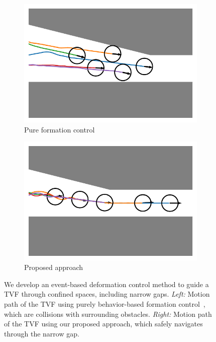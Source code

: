 \begin{figure}
\centering
\begin{subfigure}[b]{0.4\textwidth}
    
    \centering
    \includegraphics[width=\linewidth]{paper2/images/sample_bc.pdf}
    \caption{Pure formation control}
    \label{fig:1sample_bc}
\end{subfigure}
\begin{subfigure}[b]{0.4\textwidth}
    \centering
    \includegraphics[width=\linewidth]{paper2/images/sample_edc.pdf}
    \caption{Proposed approach}
    \label{fig:1sample_edc}
\end{subfigure}
\caption{We develop an event-based deformation control method to guide a TVF through confined spaces, including narrow gaps. \textit{Left:} Motion path of the TVF using purely behavior-based formation control~\cite{736776, Vsrhelyi2018}, which are collisions with surrounding obstacles. \textit{Right:} Motion path of the TVF using our proposed approach, which safely navigates through the narrow gap.}
\label{fig:1sample}
\end{figure}

